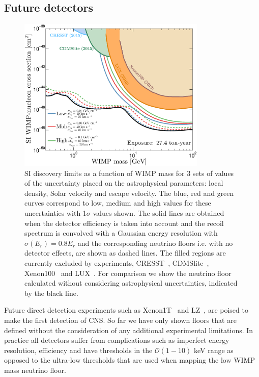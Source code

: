 \subsection{Future detectors}\label{sec:nufloor_future}
\begin{figure}
\begin{center}
\includegraphics[trim = 0mm 0 0mm 0mm, clip, width=0.8\textwidth,angle=0]{Figures/DL_Resolution.eps}
\caption[Neutrino floor for a realistic detector]{SI discovery limits as a function of WIMP mass for 3 sets of values of the uncertainty placed on the astrophysical parameters: local density, Solar velocity and escape velocity. The blue, red and green curves correspond to low, medium and high values for these uncertainties with 1$\sigma$ values shown. The solid lines are obtained when the detector efficiency is taken into account and the recoil spectrum is convolved with a Gaussian energy resolution with $\sigma(E_r) = 0.8 E_r$ and the corresponding neutrino floors i.e. with no detector effects, are shown as dashed lines. The filled regions are currently excluded by experiments, CRESST~\cite{Angloher:2015ewa}, CDMSlite~\cite{Agnese:2015nto}, Xenon100~\cite{Aprile:2012nq} and LUX~\cite{Akerib:2016vxi}. For comparison we show the neutrino floor calculated without considering astrophysical uncertainties, indicated by the black line.}
\label{fig:DL_Resolution}
\end{center}
\end{figure}
Future direct detection experiments such as Xenon1T~\cite{Aprile:2015uzo} and  LZ~\cite{Akerib:2015cja}, are poised to make the first detection of CNS. So far we have only shown floors that are defined without the consideration of any additional experimental limitations. In practice all detectors suffer from complications such as imperfect energy resolution, efficiency and have thresholds in the $\mathcal{O}(1-10)$ keV range as opposed to the ultra-low thresholds that are used when mapping the low WIMP mass neutrino floor.

